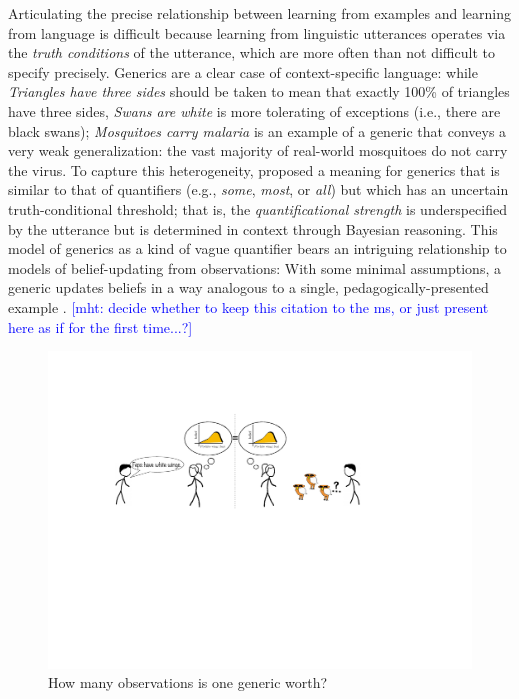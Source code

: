 \documentclass[10pt,letterpaper]{article}
\newcommand{\mht}[1]{\textcolor{Blue}{[mht: #1]}}
\begin{document}

Articulating the precise relationship between learning from examples and learning from language is difficult because learning from linguistic utterances operates via the \emph{truth conditions} of the utterance, which are more often than not difficult to specify precisely. %
Generics are a clear case of context-specific language:  while \emph{Triangles have three sides} should be taken to mean that exactly 100\% of triangles have three sides, \emph{Swans are white} is more tolerating of exceptions (i.e., there are black swans); \emph{Mosquitoes carry malaria} is an example of a generic that conveys a very weak generalization: the vast majority of real-world mosquitoes do not carry the virus. 
To capture this heterogeneity,  proposed a meaning for generics that is similar to that of quantifiers (e.g., \emph{some}, \emph{most}, or \emph{all}) but which has an uncertain truth-conditional threshold; that is, the \emph{quantificational strength} is underspecified by the utterance but is determined in context through Bayesian reasoning. 
This model of generics as a kind of vague quantifier bears an intriguing relationship to models of belief-updating from observations: With some minimal assumptions, a generic updates beliefs in a way analogous to a single, pedagogically-presented example \cite{tessler2020learning}. \mht{decide whether to keep this citation to the ms, or just present here as if for the first time...?}

\begin{figure}[t]
\begin{center}
\includegraphics[width=\linewidth]{figs/cartoon-fig.pdf}
\end{center}
\caption{How many observations is one generic worth?}
\label{fig:cartoon}
\end{figure}
\end{document}
